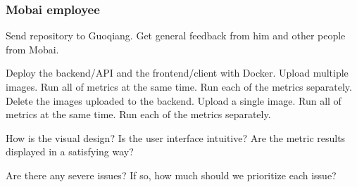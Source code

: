 \subsubsection{Mobai employee}
Send repository to Guoqiang. Get general feedback from him and other people from Mobai.

Deploy the backend/API and the frontend/client with Docker.
Upload multiple images.
Run all of metrics at the same time.
Run each of the metrics separately. 
Delete the images uploaded to the backend.
Upload a single image.
Run all of metrics at the same time.
Run each of the metrics separately. 

How is the visual design?
Is the user interface intuitive?
Are the metric results displayed in a satisfying way?

Are there any severe issues? If so, how much should we prioritize each issue? 

